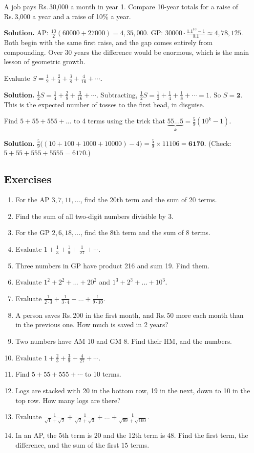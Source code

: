 \documentclass[11pt,a4paper,openany]{report}
\newenvironment{exercises}{\subsection*{Exercises \thechapter}\begin{enumerate}[label=\textbf{\thechapter.\arabic*},leftmargin=3.2em]}{\end{enumerate}}
\newcommand{\Rs}{Rs.\,}
\begin{document}
\begin{example}
A job pays \Rs30,000 a month in year 1. Compare 10-year totals for a raise of \Rs3,000 a year and a raise of 10\% a year.

\textbf{Solution.} AP: $\frac{10}2(60000+27000)=4,35,000$. GP: $30000\cdot\frac{1.1^{10}-1}{0.1}\approx4,78,125$. Both begin with the same first raise, and the gap comes entirely from compounding. Over 30 years the difference would be enormous, which is the main lesson of geometric growth.
\end{example}

\begin{example}
Evaluate $S=\frac12+\frac24+\frac38+\frac4{16}+\cdots$.

\textbf{Solution.} $\frac12S=\frac14+\frac28+\frac3{16}+\cdots$. Subtracting, $\frac12S=\frac12+\frac14+\frac18+\cdots=1$. So $S=\mathbf{2}$. This is the expected number of tosses to the first head, in disguise.
\end{example}

\begin{example}
Find $5+55+555+\dots$ to 4 terms using the trick that $\underbrace{55\ldots5}_{k}=\frac59(10^k-1)$.

\textbf{Solution.} $\frac59\big((10+100+1000+10000)-4\big)=\frac59\times11106=\mathbf{6170}$. (Check: $5+55+555+5555=6170$.)
\end{example}

\begin{exercises}
\item For the AP $3,7,11,\dots$, find the 20th term and the sum of 20 terms.
\item Find the sum of all two-digit numbers divisible by 3.
\item For the GP $2,6,18,\dots$, find the 8th term and the sum of 8 terms.
\item Evaluate $1+\frac13+\frac19+\frac1{27}+\cdots$.
\item Three numbers in GP have product 216 and sum 19. Find them.
\item Evaluate $1^2+2^2+\dots+20^2$ and $1^3+2^3+\dots+10^3$.
\item Evaluate $\frac1{2\cdot3}+\frac1{3\cdot4}+\dots+\frac1{9\cdot10}$.
\item A person saves \Rs200 in the first month, and \Rs50 more each month than in the previous one. How much is saved in 2 years?
\item Two numbers have AM 10 and GM 8. Find their HM, and the numbers.
\item Evaluate $1+\frac23+\frac39+\frac4{27}+\cdots$.
\item Find $5+55+555+\cdots$ to 10 terms.
\item Logs are stacked with 20 in the bottom row, 19 in the next, down to 10 in the top row. How many logs are there?
\item Evaluate $\frac1{\sqrt1+\sqrt2}+\frac1{\sqrt2+\sqrt3}+\dots+\frac1{\sqrt{99}+\sqrt{100}}$.
\item In an AP, the 5th term is 20 and the 12th term is 48. Find the first term, the difference, and the sum of the first 15 terms.
\end{exercises}
\end{document}
